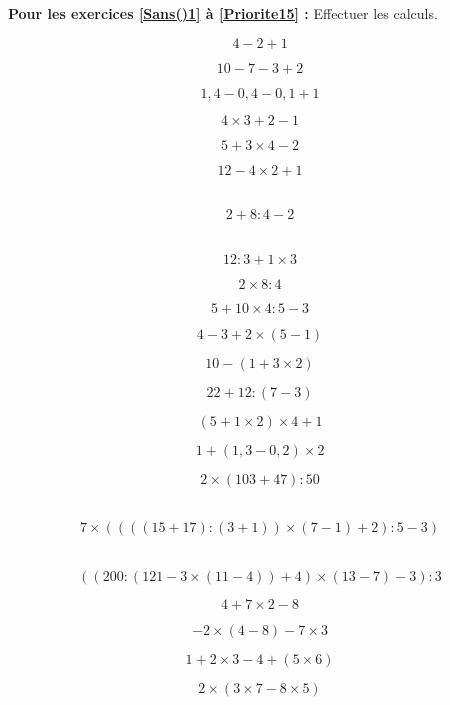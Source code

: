 \textbf{Pour les exercices \ref{Sans()1} à \ref{Priorite15} :} Effectuer les calculs.


\begin{multicols}{4}
  $$4-2+1$$

  $$10-7-3+2$$

  $$1,4-0,4-0,1+1$$

  $$4\times 3+2-1$$
\end{multicols}

\begin{multicols}{4}
  $$5+3\times 4-2$$

  $$12-4\times 2+1$$

  \\
  $$2+8:4-2$$

  \\
  $$12:3+1\times 3$$
\end{multicols}

\begin{multicols}{4}
  $$2\times 8:4$$

  $$5+10\times 4:5-3$$

  $$4-3+2\times (5-1)$$

  $$10-(1+3\times 2)$$
\end{multicols}

\begin{multicols}{4}
  $$22+12:(7-3)$$

  $$(5+1\times 2)\times 4+1$$

  $$1+(1,3-0,2)\times 2$$

  $$2\times (103+47):50$$
\end{multicols}

\begin{multicols}{2}
  \\
  $$7\times ((((15+17):(3+1))\times (7-1)+2):5-3)$$

  \\
  $$((200:(121-3\times (11-4))+4)\times (13-7)-3):3$$
\end{multicols}

\begin{multicols}{4}
    $$4+7\times 2 -8$$
      
    $$-2\times (4-8)-7\times 3$$
      
    $$1+2\times 3 -4+(5\times 6)$$

  $$2\times (3\times 7-8\times 5)$$
\end{multicols}

